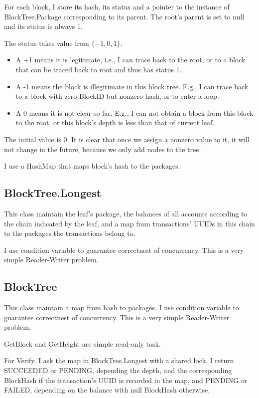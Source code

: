 \documentclass{article}
\begin{document}
For each block, I store its hash, its status and a pointer to the instance of BlockTree.Package corresponding to its parent.
The root's parent is set to null and its status is always 1.

The status takes value from $\{-1,0,1\}$.
\begin{itemize} 
\item A +1 means it is legitimate, i.e., I can trace back to the root, or to a block that can be traced back to root and thus has status 1.
\item A -1 means the block is illegitimate in this block tree. E.g., I can trace back to a block with zero BlockID but nonzero hash, or to enter a loop.
\item A 0 means it is not clear so far. E.g., I can not obtain a block from this block to the root, or this block's depth is less than that of current leaf.
\end{itemize}
The initial value is 0. It is clear that once we assign a nonzero value to it, it will not change in the future, because we only add nodes to the tree.

I use a HashMap that maps block's hash to the packages.

\subsection{BlockTree.Longest}

This class maintain the leaf's package, the balances of all accounts according to the chain indicated by the leaf, and a map from transactions' UUIDs in this chain to the packages the transactions belong to.

I use condition variable to guarantee correctnest of concurrency.
This is a very simple Reader-Writer problem.

\subsection{BlockTree}

This class maintain a map from hash to packages.
I use condition variable to guarantee correctnest of concurrency.
This is a very simple Reader-Writer problem.

GetBlock and GetHeight are simple read-only task.

For Verify, I ask the map in BlockTree.Longest with a shared lock. 
I return SUCCEEDED or PENDING, depending the depth, and the corresponding BlockHash if the transaction's UUID is recorded in the map, and PENDING or FAILED, depending on the balance with null BlockHash otherwise.
\end{document}
